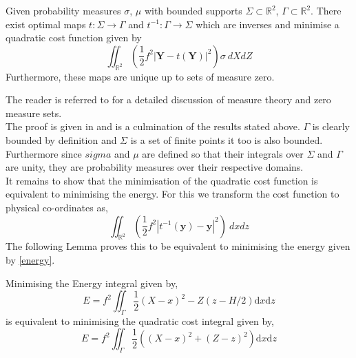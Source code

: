 \begin{theorem}
	Given probability measures $\sigma$, $\mu$ with bounded supports $\Sigma \subset \mathbb{R}^2$, $\Gamma \subset \mathbb{R}^2 $. There exist optimal maps $t: \Sigma \rightarrow \Gamma$ and $t^{-1}: \Gamma \rightarrow \Sigma$ which are inverses and minimise a quadratic cost function given by
	\begin{equation*}
		\iint_{\mathbb{R}^2} \left(\frac{1}{2}f^2|\bm{Y}-t(\bm{Y})|^2\right)\sigma \ dXdZ
	\end{equation*}
	Furthermore, these maps are unique up to sets of measure zero.
\end{theorem}
The reader is referred to \cite{Rudin1987} for a detailed discussion of measure theory and zero measure sets.\\
\linebreak
The proof is given in \cite{Cullen2006a} and is a culmination of the results stated above. $\Gamma$ is clearly bounded by definition and $\Sigma$ is a set of finite points it too is also bounded. Furthermore since $sigma$ and $\mu$ are defined so that their integrals over $\Sigma$ and $\Gamma$ are unity, they are probability measures over their respective domains.
\\
\linebreak
It remains to show that the minimisation of the quadratic cost function is equivalent to minimising the energy. For this we transform the cost function to physical co-ordinates as,
\begin{equation*}
\iint_{\mathbb{R}^2} \left(\frac{1}{2}f^2|t^{-1}(\bm{y})-\bm{y}|^2\right) \ dxdz
\end{equation*}
The following Lemma proves this to be equivalent to minimising the energy given by \ref{energy}.
\begin{lemma}
	Minimising the Energy integral given by,
	\begin{equation*}
	E = f^2 \iint_{\Gamma} \frac{1}{2}\left(X-x\right)^2 - Z\left(z - H/2\right)\textrm{d}x\textrm{d}z
	\end{equation*} 
	is equivalent to minimising the quadratic cost integral given by,
	\begin{equation*}
	E = f^2 \iint_{\Gamma} \frac{1}{2}\left(\left(X-x\right)^2 + \left(Z - z\right)^2\right)\textrm{d}x\textrm{d}z
	\label{energy1}
	\end{equation*}
	\label{energy lemma}
\end{lemma}
